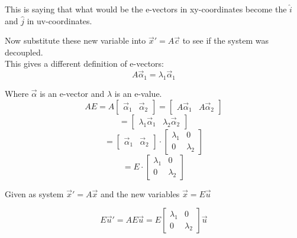 \documentclass[12pt]{article}
\numberwithin{equation}{subsection}
\newcommand{\indd}{\hspace{2cm}}
\begin{document}
This is saying that what would be the e-vectors in xy-coordinates become the $\hat{i}$ and $\hat{j}$ in uv-coordinates.

Now substitute these new variable into $\vec{x}'=A\vec{c}$ to see if the system was decoupled.\\

This gives a different definition of e-vectors:
\begin{equation}
A\vec{\alpha}_1=\lambda_1\vec{\alpha}_1
\end{equation}

\indd Where $\vec{\alpha}$ is an e-vector and $\lambda$ is an e-value.\\

\begin{equation}
AE= A\begin{bmatrix}
\vec{\alpha}_1 & \vec{\alpha}_2
\end{bmatrix} = \begin{bmatrix}
A\vec{\alpha}_1 & A\vec{\alpha}_2
\end{bmatrix}
\end{equation}
\begin{equation}
=\begin{bmatrix}
\lambda_1 \vec{\alpha}_1 & \lambda_2
\vec{\alpha}_2
\end{bmatrix}
\end{equation}
\begin{equation}
=\begin{bmatrix}
\vec{\alpha}_1 & \vec{\alpha}_2
\end{bmatrix} \cdot \begin{bmatrix}
\lambda_1 & 0 \\
0 & \lambda_2
\end{bmatrix}
\end{equation}
\begin{equation}
=E \cdot \begin{bmatrix}
\lambda_1 & 0 \\
0 & \lambda_2
\end{bmatrix}
\end{equation}

Given as system $\vec{x}'=A\vec{x}$ and the new variables $\vec{x}=E\vec{u}$

\begin{equation}
E\vec{u}'=AE\vec{u}=E\begin{bmatrix}
\lambda_1 & 0 \\
0 & \lambda_2
\end{bmatrix} \vec{u}
\end{equation}
\end{document}
